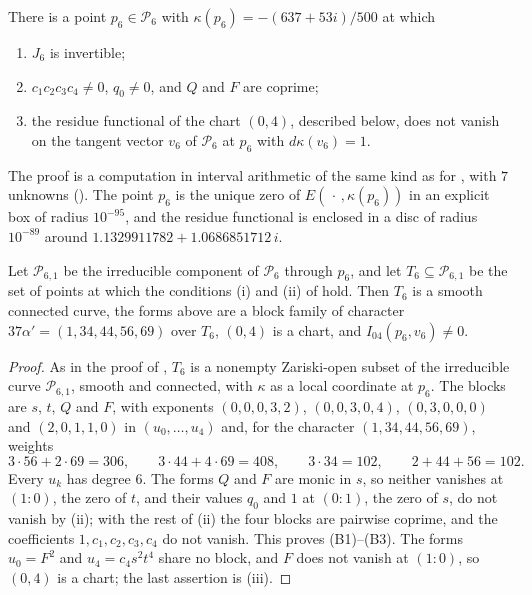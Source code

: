 \begin{proposition}\label{prop:family51a}
There is a point $p_{6}\in\mathcal P_{6}$ with $\kappa(p_{6})=-(637+53i)/500$
at which
\begin{enumerate}[label=\textup{(\roman*)}]
\item $J_{6}$ is invertible;
\item $c_{1}c_{2}c_{3}c_{4}\ne0$, $q_{0}\ne0$, and $Q$ and $F$ are coprime;
\item the residue functional of the chart $(0,4)$, described below, does
not vanish on the tangent vector $v_{6}$ of $\mathcal P_{6}$ at $p_{6}$ with
$d\kappa(v_{6})=1$.
\end{enumerate}
\end{proposition}

The proof is a computation in interval arithmetic of the same kind as for
, with $7$ unknowns (). The point
$p_{6}$ is the unique zero of $E(\,\cdot\,,\kappa(p_{6}))$ in an explicit box
of radius $10^{-95}$, and the residue functional is enclosed in a disc of
radius $10^{-89}$ around $1.1329911782+1.0686851712\,i$.

\begin{corollary}\label{cor:family51a}
Let $\mathcal P_{6,1}$ be the irreducible component of $\mathcal P_{6}$
through $p_{6}$, and let $T_{6}\subseteq\mathcal P_{6,1}$ be the set of
points at which the conditions \textup{(i)} and \textup{(ii)} of
 hold. Then $T_{6}$ is a smooth connected curve, the
forms above are a block family of character $37\alpha'=(1,34,44,56,69)$ over
$T_{6}$, $(0,4)$ is a chart, and $I_{04}(p_{6},v_{6})\ne0$.
\end{corollary}

\begin{proof}
As in the proof of , $T_{6}$ is a nonempty Zariski-open
subset of the irreducible curve $\mathcal P_{6,1}$, smooth and connected,
with $\kappa$ as a local coordinate at $p_{6}$. The blocks are $s$, $t$, $Q$
and $F$, with exponents $(0,0,0,3,2)$, $(0,0,3,0,4)$, $(0,3,0,0,0)$ and
$(2,0,1,1,0)$ in $(u_{0},\dots,u_{4})$ and, for the character
$(1,34,44,56,69)$, weights
\[
  3\cdot56+2\cdot69=306,\qquad 3\cdot44+4\cdot69=408,\qquad 3\cdot34=102,
  \qquad 2+44+56=102 .
\]
Every $u_{k}$ has degree $6$. The forms $Q$ and $F$ are monic in $s$, so
neither vanishes at $(1:0)$, the zero of $t$, and their values $q_{0}$ and
$1$ at $(0:1)$, the zero of $s$, do not vanish by (ii); with the rest of
(ii) the four blocks are pairwise coprime, and the coefficients
$1,c_{1},c_{2},c_{3},c_{4}$ do not vanish. This proves (B1)--(B3). The forms
$u_{0}=F^{2}$ and $u_{4}=c_{4}s^{2}t^{4}$ share no block, and $F$ does not
vanish at $(1:0)$, so $(0,4)$ is a chart; the last assertion is (iii).
\end{proof}

